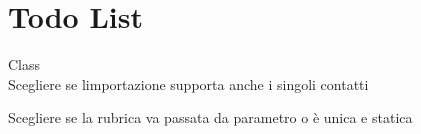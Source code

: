 \chapter{Todo List}
\hypertarget{todo}{}\label{todo}

\begin{DoxyRefList}
\item[Class \doxylink{classcom_1_1unisa_1_1software__engineering_1_1project_1_1_model_1_1_file_manager}{com.unisa.software\+\_\+engineering.project.Model.File\+Manager} ]\hfill \\
\label{todo__todo000002}%
%
Scegliere se l\textquotesingle{}importazione supporta anche i singoli contatti 



Scegliere se la rubrica va passata da parametro o è unica e statica 
\end{DoxyRefList}